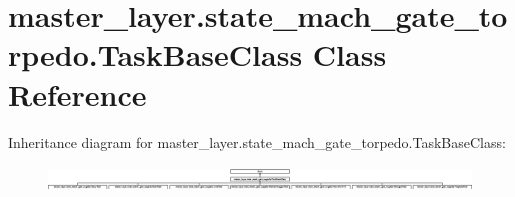 \hypertarget{classmaster__layer_1_1state__mach__gate__torpedo_1_1TaskBaseClass}{}\section{master\+\_\+layer.\+state\+\_\+mach\+\_\+gate\+\_\+torpedo.\+Task\+Base\+Class Class Reference}
\label{classmaster__layer_1_1state__mach__gate__torpedo_1_1TaskBaseClass}
Inheritance diagram for master\+\_\+layer.\+state\+\_\+mach\+\_\+gate\+\_\+torpedo.\+Task\+Base\+Class\+:\begin{figure}[H]
\begin{center}
\leavevmode
\includegraphics[height=0.668524cm]{classmaster__layer_1_1state__mach__gate__torpedo_1_1TaskBaseClass}
\end{center}
\end{figure}
